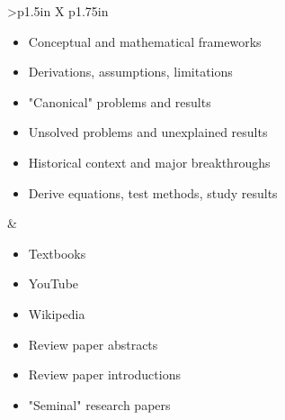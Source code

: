 \documentclass[8pt]{extarticle}
\begin{document}
\begin{tabularx}{\linewidth}{>{\bfseries}p{1.5in} X p{1.75in}}
\begin{minipage}[t]{\linewidth}
                    \begin{whenBox}
                    \begin{itemize}[nosep,leftmargin=*]
                        \item Conceptual and mathematical frameworks
                        \item Derivations, assumptions, limitations
                        \item "Canonical" problems and results
                        \item Unsolved problems and unexplained results
                        \item Historical context and major breakthroughs
                    \end{itemize}
                    \end{whenBox}

                    \begin{tipsBox}
                    \begin{itemize}[nosep,leftmargin=*]
                        \item Derive equations, test methods, study results
                    \end{itemize}
                    \end{tipsBox}
                \end{minipage}
                
                    &   \begin{minipage}[t]{\linewidth}
                            \vspace{0pt}

                            \begin{sourcesBox}
                            \begin{itemize}[nosep,leftmargin=*]
                                \item Textbooks
                                \item YouTube
                                \item Wikipedia
                                \item Review paper abstracts
                                \item Review paper introductions
                                \item "Seminal" research papers
                            \end{itemize}
                            \end{sourcesBox}


\end{minipage}
\end{tabularx}
\end{document}
